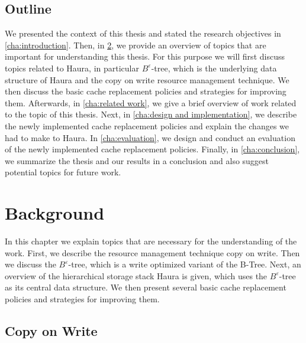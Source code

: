 \documentclass[
	12pt,
	a4paper,
	abstract,
	bibliography=totoc,
	chapterprefix,
	headings=openright,
	numbers=endperiod,
	parskip=half,
	twoside,
]{scrreprt}
\begin{document}
\section{Outline}

We presented the context of this thesis and stated the research objectives in \cref{cha:introduction}.
Then, in \cref{cha:background}, we provide an overview of topics that are important for understanding this thesis.
For this purpose we will first discuss topics related to Haura, in particular $B^{\varepsilon}$-tree,
which is the underlying data structure of Haura and the copy on write resource management technique.
We then discuss the basic cache replacement policies and strategies for improving them.
Afterwards, in \cref{cha:related work}, we give a brief overview of work related to the topic of this thesis.
Next, in \cref{cha:design and implementation}, we describe the newly implemented cache replacement policies 
and explain the changes we had to make to Haura.
In \cref{cha:evaluation}, we design and conduct an evaluation of the newly implemented cache replacement policies.
Finally, in \cref{cha:conclusion}, we summarize the thesis and our results in a conclusion and
 also suggest potential topics for future work.


\chapter{Background}
\label{cha:background}


In this chapter we explain topics that are necessary for the understanding of the work.
First, we describe the resource management technique copy on write. Then we discuss the $B^{\varepsilon}$-tree, 
which is a write optimized variant of the B-Tree.
Next, an overview of the hierarchical storage stack Haura is given, 
which uses the $B^{\varepsilon}$-tree as its central data structure.
We then present several basic cache replacement policies and strategies for improving them.

\section{Copy on Write}
\label{sec:copy on write}
\end{document}
